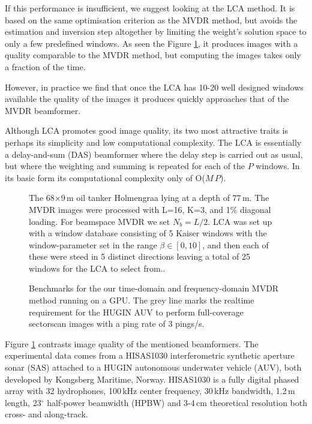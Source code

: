 If this performance is insufficient, we suggest looking at the LCA method. It is based on the same optimisation criterion as the MVDR method, but avoids the estimation and inversion step altogether by limiting the weight's solution space to only a few predefined windows. As seen the Figure \ref{2_fig_holmengraa}, it produces images with a quality comparable to the MVDR method, but computing the images takes only a fraction of the time.

However, in practice we find that once the LCA has 10-20 well designed windows available the quality of the images it produces quickly approaches that of the MVDR beamformer.

Although LCA promotes good image quality, its two most attractive traits is perhaps its simplicity and low computational complexity. The LCA is essentially a delay-and-sum (DAS) beamformer where the delay step is carried out as usual, but where the weighting and summing is repeated for each of the $P$ windows. In its basic form its computational complexity only of O($M\,P$).


\begin{figure}[!t]\centering\label{2_fig_holmengraa}%
%
\caption{The 68$\times$9\,m oil tanker Holmengraa lying at a depth of 77\,m. The MVDR images were processed with L=16, K=3, and 1\% diagonal loading. For beamspace MVDR we set $N_b=L/2$. LCA was set up with a window database consisting of 5 Kaiser windows with the window-parameter set in the range $\beta\in[0,10]$, and then each of these were steed in 5 distinct directions leaving a total of 25 windows for the LCA to select from..}
\end{figure}

\begin{figure}[!h]\centering%
%
\caption{Benchmarks for the our time-domain and frequency-domain MVDR method running on a GPU. The grey line marks the realtime requirement for the HUGIN AUV to perform full-coverage sectorscan images with a ping rate of 3 pings/s.}\label{2_fig_benchmark}
\end{figure}



Figure \ref{2_fig_holmengraa} contrasts image quality of the mentioned beamformers. The experimental data comes from a HISAS1030 interferometric synthetic aperture sonar (SAS) attached to a HUGIN autonomous underwater vehicle (AUV), both developed by Kongsberg Maritime, Norway. HISAS1030 is a fully digital phased array with 32 hydrophones, 100\,kHz center frequency, 30\,kHz bandwidth, 1.2\,m length, 23$^\circ$ half-power beamwidth (HPBW) and 3-4\,cm theoretical resolution both cross- and along-track. 

